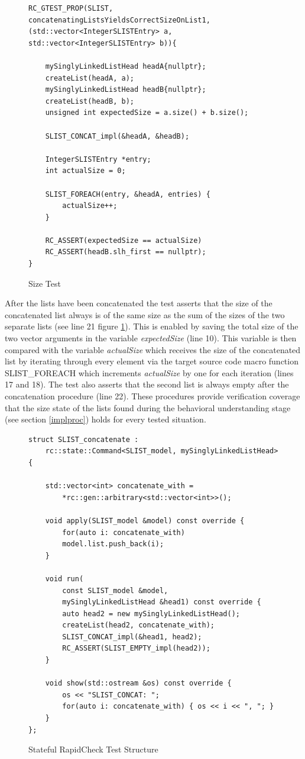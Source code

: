 \begin{figure}[H]
 \vspace{12pt}
\begin{lstlisting}[style=CSTYLE] 
RC_GTEST_PROP(SLIST, 
concatenatingListsYieldsCorrectSizeOnList1, 
(std::vector<IntegerSLISTEntry> a,
std::vector<IntegerSLISTEntry> b)){

    mySinglyLinkedListHead headA{nullptr};
    createList(headA, a);
    mySinglyLinkedListHead headB{nullptr};
    createList(headB, b);
    unsigned int expectedSize = a.size() + b.size();
    
    SLIST_CONCAT_impl(&headA, &headB);
    
    IntegerSLISTEntry *entry;
    int actualSize = 0;
    
    SLIST_FOREACH(entry, &headA, entries) {
        actualSize++;
    }
    
    RC_ASSERT(expectedSize == actualSize)  
    RC_ASSERT(headB.slh_first == nullptr);
}
\end{lstlisting}
    \caption{Size Test}
    \label{fig:size}
\end{figure}
After the lists have been concatenated the test asserts that the size of the concatenated list always is of the same size as the sum of the sizes of the two separate lists (see line 21 figure \ref{fig:size}). This is enabled by saving the total size of the two vector arguments in the variable \textit{expectedSize} (line 10). This variable is then compared with the variable \textit{actualSize} which receives the size of the concatenated list by iterating through every element via the target source code macro function SLIST\_FOREACH which increments \textit{actualSize} by one for each iteration (lines 17 and 18). The test also asserts that the second list is always empty after the concatenation procedure (line 22). These procedures provide verification coverage that the size state of the lists found during the behavioral understanding stage (see section \ref{implproc}) holds for every tested situation.
\begin{figure}[H]
 \vspace{12pt}
\begin{lstlisting}[style=CSTYLE]
struct SLIST_concatenate : 
    rc::state::Command<SLIST_model, mySinglyLinkedListHead> {
    
    std::vector<int> concatenate_with = 
        *rc::gen::arbitrary<std::vector<int>>();

    void apply(SLIST_model &model) const override {
        for(auto i: concatenate_with)
        model.list.push_back(i);
    }

    void run(
        const SLIST_model &model, 
        mySinglyLinkedListHead &head1) const override {
        auto head2 = new mySinglyLinkedListHead();
        createList(head2, concatenate_with);
        SLIST_CONCAT_impl(&head1, head2);
        RC_ASSERT(SLIST_EMPTY_impl(head2));
    }

    void show(std::ostream &os) const override {
        os << "SLIST_CONCAT: ";
        for(auto i: concatenate_with) { os << i << ", "; }
    }
};
\end{lstlisting}
    \caption{Stateful RapidCheck Test Structure}
    \label{fig:statefulrc}
\end{figure}

